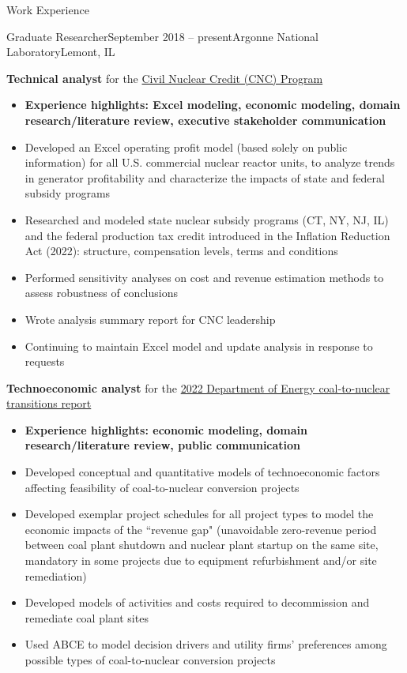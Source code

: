 \documentclass{resume} %
\begin{document}
\begin{rSection}{Work Experience}
\begin{rSubsection}{Graduate Researcher}{September 2018 -- present}{Argonne National Laboratory}{Lemont, IL}
  \item \textbf{Technical analyst} for the \href{https://www.energy.gov/gdo/civil-nuclear-credit-program}{Civil Nuclear Credit (CNC) Program}
  \begin{itemize}
    \setlength{\itemsep}{-3pt}
    \item \textbf{Experience highlights: Excel modeling, economic modeling, domain research/literature review, executive stakeholder communication}
    \item Developed an Excel operating profit model (based solely on public information) for all U.S. commercial nuclear reactor units, to analyze trends in generator profitability and characterize the impacts of state and federal subsidy programs
    \item Researched and modeled state nuclear subsidy programs (CT, NY, NJ, IL) and the federal production tax credit introduced in the Inflation Reduction Act (2022): structure, compensation levels, terms and conditions
    \item Performed sensitivity analyses on cost and revenue estimation methods to assess robustness of conclusions
    \item Wrote analysis summary report for CNC leadership
    \item Continuing to maintain Excel model and update analysis in response to requests
  \end{itemize}

  \item \textbf{Technoeconomic analyst} for the \href{https://www.energy.gov/ne/articles/doe-report-finds-hundreds-retiring-coal-plant-sites-could-convert-nuclear}{2022 Department of Energy coal-to-nuclear transitions report}
  \begin{itemize}
    \setlength{\itemsep}{-3pt}
    \item \textbf{Experience highlights: economic modeling, domain research/literature review, public communication}
    \item Developed conceptual and quantitative models of technoeconomic factors affecting feasibility of coal-to-nuclear conversion projects
    \item Developed exemplar project schedules for all project types to model the economic impacts of the ``revenue gap" (unavoidable zero-revenue period between coal plant shutdown and nuclear plant startup on the same site, mandatory in some projects due to equipment refurbishment and/or site remediation)
    \item Developed models of activities and costs required to decommission and remediate coal plant sites
    \item Used ABCE to model decision drivers and utility firms' preferences among possible types of coal-to-nuclear conversion projects
  \end{itemize}


\end{rSubsection}
\end{rSection}
\end{document}
